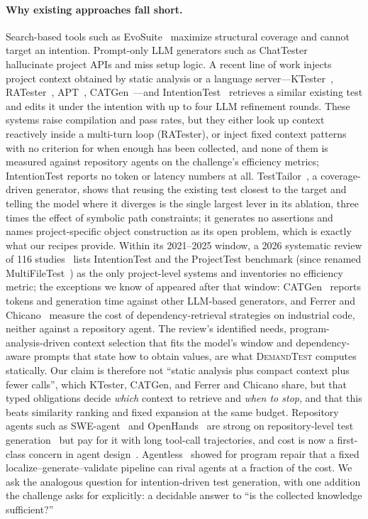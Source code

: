 \documentclass[sigconf,nonacm]{acmart}
\newcommand{\tool}{\textsc{DemandTest}\xspace}
\begin{document}
\paragraph{Why existing approaches fall short.}
Search-based tools such as EvoSuite~\cite{fraser2011evosuite} maximize structural coverage and cannot target an intention. Prompt-only LLM generators such as ChatTester~\cite{yuan2024chattester} hallucinate project APIs and miss setup logic. A recent line of work injects project context obtained by static analysis or a language server---KTester~\cite{li2026ktester}, RATester~\cite{yin2025ratester}, APT~\cite{zhang2024apt}, CATGen~\cite{chen2026catgen}---and IntentionTest~\cite{qi2025intentiontest} retrieves a similar existing test and edits it under the intention with up to four LLM refinement rounds. These systems raise compilation and pass rates, but they either look up context reactively inside a multi-turn loop (RATester), or inject fixed context patterns with no criterion for when enough has been collected, and none of them is measured against repository agents on the challenge's efficiency metrics; IntentionTest reports no token or latency numbers at all. TestTailor~\cite{zhou2026testtailor}, a coverage-driven generator, shows that reusing the existing test closest to the target and telling the model where it diverges is the single largest lever in its ablation, three times the effect of symbolic path constraints; it generates no assertions and names project-specific object construction as its open problem, which is exactly what our recipes provide. Within its 2021--2025 window, a 2026 systematic review of 116 studies~\cite{zhang2026slr} lists IntentionTest and the ProjectTest benchmark (since renamed MultiFileTest~\cite{wang2026multifiletest}) as the only project-level systems and inventories no efficiency metric; the exceptions we know of appeared after that window: CATGen~\cite{chen2026catgen} reports tokens and generation time against other LLM-based generators, and Ferrer and Chicano~\cite{ferrer2026context} measure the cost of dependency-retrieval strategies on industrial code, neither against a repository agent. The review's identified needs, program-analysis-driven context selection that fits the model's window and dependency-aware prompts that state how to obtain values, are what \tool computes statically. Our claim is therefore not ``static analysis plus compact context plus fewer calls'', which KTester, CATGen, and Ferrer and Chicano share, but that typed obligations decide \emph{which} context to retrieve and \emph{when to stop}, and that this beats similarity ranking and fixed expansion at the same budget. Repository agents such as SWE-agent~\cite{yang2024sweagent} and OpenHands~\cite{wang2025openhands} are strong on repository-level test generation~\cite{mundler2024swtbench} but pay for it with long tool-call trajectories, and cost is now a first-class concern in agent design~\cite{wang2025efficientagents}. Agentless~\cite{xia2025agentless} showed for program repair that a fixed localize--generate--validate pipeline can rival agents at a fraction of the cost. We ask the analogous question for intention-driven test generation, with one addition the challenge asks for explicitly: a decidable answer to ``is the collected knowledge sufficient?''
\end{document}
